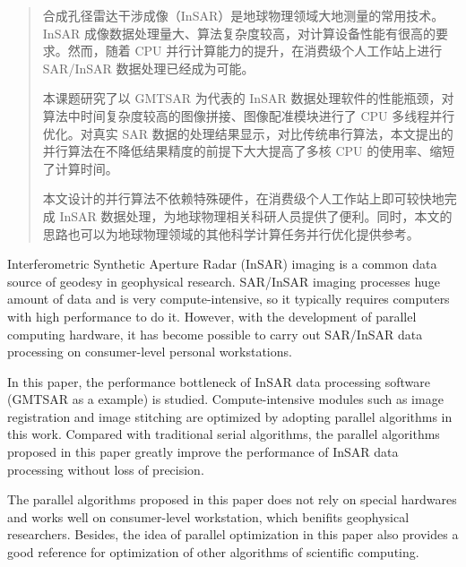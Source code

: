 ﻿\begin{abstract}

合成孔径雷达干涉成像（InSAR）是地球物理领域大地测量的常用技术。InSAR 成像数据处理量大、算法复杂度较高，对计算设备性能有很高的要求。然而，随着 CPU 并行计算能力的提升，在消费级个人工作站上进行 SAR/InSAR 数据处理已经成为可能。

本课题研究了以 GMTSAR 为代表的 InSAR 数据处理软件的性能瓶颈，对算法中时间复杂度较高的图像拼接、图像配准模块进行了 CPU 多线程并行优化。对真实 SAR 数据的处理结果显示，对比传统串行算法，本文提出的并行算法在不降低结果精度的前提下大大提高了多核 CPU 的使用率、缩短了计算时间。

本文设计的并行算法不依赖特殊硬件，在消费级个人工作站上即可较快地完成 InSAR 数据处理，为地球物理相关科研人员提供了便利。同时，本文的思路也可以为地球物理领域的其他科学计算任务并行优化提供参考。
    
\end{abstract}

\begin{enabstract}
Interferometric Synthetic Aperture Radar (InSAR) imaging is a common data source of geodesy in geophysical research. SAR/InSAR imaging processes huge amount of data and is very compute-intensive, so it typically requires computers with high performance to do it. However, with the development of parallel computing hardware, it has become possible to carry out SAR/InSAR data processing on consumer-level personal workstations.

In this paper, the performance bottleneck of InSAR data processing software (GMTSAR as a example) is studied. Compute-intensive modules such as image registration and image stitching are optimized by adopting parallel algorithms in this work. Compared with traditional serial algorithms, the parallel algorithms proposed in this paper greatly improve the performance of InSAR data processing without loss of precision.

The parallel algorithms proposed in this paper does not rely on special hardwares and works well on consumer-level workstation, which benifits geophysical researchers. Besides, the idea of parallel optimization in this paper also provides a good reference for optimization of other algorithms of scientific computing.

\end{enabstract}
